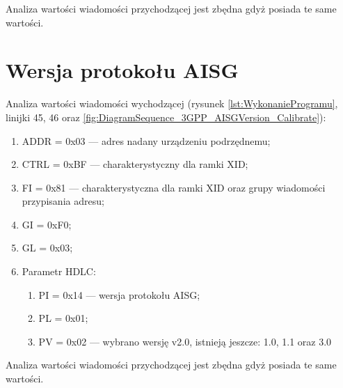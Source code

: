 Analiza wartości wiadomości przychodzącej jest zbędna gdyż posiada te same wartości.


\section{Wersja protokołu AISG}
Analiza wartości wiadomości wychodzącej 
(rysunek \ref{lst:WykonanieProgramu}, linijki {45, 46} oraz \ref{fig:DiagramSequence_3GPP_AISGVersion_Calibrate}):
\begin{enumerate}
    \item ADDR = 0x03 --- adres nadany urządzeniu podrzędnemu;
    \item CTRL = 0xBF --- charakterystyczny dla ramki XID;
    \item FI = 0x81 --- charakterystyczna dla ramki XID oraz grupy wiadomości przypisania adresu;
    \item GI = 0xF0;
    \item GL = 0x03;
    \item Parametr HDLC:
    \begin{enumerate}
        \item PI = 0x14 --- wersja protokołu AISG;
        \item PL = 0x01;
        \item PV = 0x02 --- wybrano wersję v2.0, istnieją jeszcze: 1.0, 1.1 oraz 3.0
    \end{enumerate}
\end{enumerate}
Analiza wartości wiadomości przychodzącej jest zbędna gdyż posiada te same wartości.

